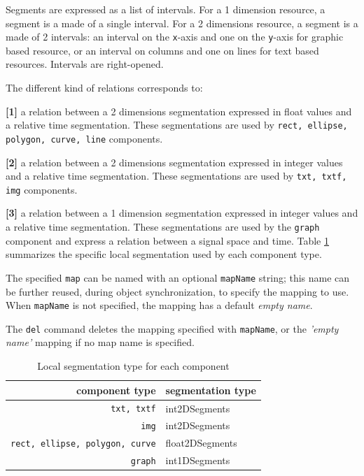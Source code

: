 \documentclass[a4paper,twoside]{report}
\newcommand{\OSC}[1]		{\texttt{#1}}
\newcommand{\values}[1]		{\texttt{#1}}
\let\olditemize\itemize
\let\oldenditemize\enditemize
\renewenvironment{itemize} 	{\olditemize \setlength{\itemsep}{1mm}}{\oldenditemize}
\begin{document}
Segments are expressed as a list of intervals. For a 1 dimension resource, a segment is a made of a single interval. For a 2 dimensions resource, a segment is a made of 2 intervals: an interval on the \values{x}-axis and one on the \values{y}-axis for graphic based resource, or an interval on columns and one on lines for text based resources. Intervals are right-opened.

The different kind of relations corresponds to:
\begin{itemize}
\item \textbf{[1]} a relation between a 2 dimensions segmentation expressed in float values and a relative time segmentation. These segmentations are used by \OSC{rect, ellipse, polygon, curve, line} components.
\item \textbf{[2]} a relation between a 2 dimensions segmentation expressed in integer values and a relative time segmentation. These segmentations are used by \OSC{txt, txtf, img} components. 
\item \textbf{[3]} a relation between a 1 dimension segmentation expressed in integer values and a relative time segmentation. These segmentations are used by the \OSC{graph} component and express a relation between a signal space and time.
\end{itemize}
Table \ref{maptable} summarizes the specific local segmentation used by each component type. 

The specified \OSC{map} can be named with an optional \OSC{mapName} string; this name can be further reused, during object synchronization, to specify the mapping to use. When \OSC{mapName} is not specified, the mapping has a default \emph{empty name}.

The \OSC{del} command deletes the mapping specified with \OSC{mapName}, or the \emph{'empty name'} mapping if no map name is specified.


\begin{table}[htdp]
\caption{Local segmentation type for each component}
\begin{center}
\begin{tabular}{|r|l|}
\hline
component type & segmentation type \\
\hline
\OSC{txt, txtf}		& int2DSegments \\
\OSC{img}			& int2DSegments \\
\OSC{rect, ellipse, polygon, curve}	&  float2DSegments \\
\OSC{graph}			&  int1DSegments \\
\hline
\end{tabular}
\end{center}
\label{maptable}
\end{table}
\end{document}

